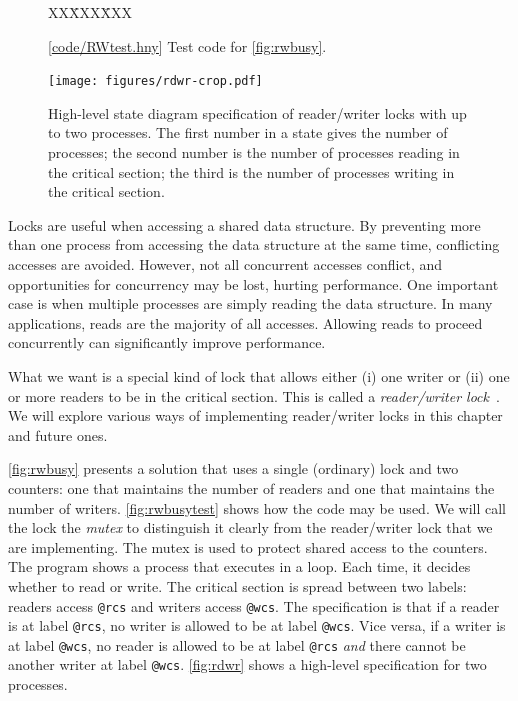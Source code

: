 \documentclass{report}
\newcommand{\harmonysource}[1]{
\begin{tabbing}
XX\=XXX\=XXX\kill
    
\end{tabbing}
}
\newcommand{\harmonylink}[1]{%
[\href{https://www.cs.cornell.edu/home/rvr/harmony/#1}{\underline{#1}}]%
}
\newenvironment{code}{
\tcolorbox
}{
\endtcolorbox
}
\begin{document}
\begin{figure}
\begin{code}
\harmonysource{RWtest}
\end{code}
\caption{\harmonylink{code/RWtest.hny} Test code for \autoref{fig:rwbusy}.}
\label{fig:rwbusytest}
\end{figure}

\begin{figure}
\begin{center}
\texttt{[image: figures/rdwr-crop.pdf]}
\end{center}
\caption{High-level state diagram specification of reader/writer locks with
up to two processes.
The first number in a state gives the number of processes; the second number is the
number of processes reading in the critical section; the third is the number of
processes writing in the critical section.}
\label{fig:rdwr}
\end{figure}

Locks are useful when accessing a shared data structure.  By preventing
more than one process from accessing the data structure at the same
time, conflicting accesses are avoided.  However, not all concurrent
accesses conflict, and opportunities for concurrency may be lost,
hurting performance.  One important case is when multiple processes
are simply reading the data structure.
In many applications, reads are the majority of all accesses.
Allowing reads to proceed concurrently can significantly improve performance.

What we want is a special kind of lock that allows either (i) one writer
or (ii) one or more readers to be in the critical section.  This is called
a \emph{reader/writer lock}~\cite{CHP71}.
We will explore various ways of implementing reader/writer locks in
this chapter and future ones.

\autoref{fig:rwbusy} presents a solution that uses a
single (ordinary) lock and two counters: one that maintains the number
of readers and one that maintains the number of writers.
\autoref{fig:rwbusytest} shows how the code may be used.
We will call the lock the \emph{mutex} to distinguish it clearly from
the reader/writer lock that we are implementing.
The mutex is used to protect shared access to the counters.
The program shows a process that executes in a loop.
Each time, it decides whether to read or write.
The critical section is spread between two labels:
readers access \texttt{@rcs} and writers access \texttt{@wcs}.
The specification is that if a reader is at label \texttt{@rcs},
no writer is allowed to be at label \texttt{@wcs}.  Vice versa, if
a writer is at label \texttt{@wcs}, no reader is allowed to be at
label \texttt{@rcs} \emph{and} there cannot be another writer at
label \texttt{@wcs}.  \autoref{fig:rdwr} shows a high-level
specification for two processes.
\end{document}

